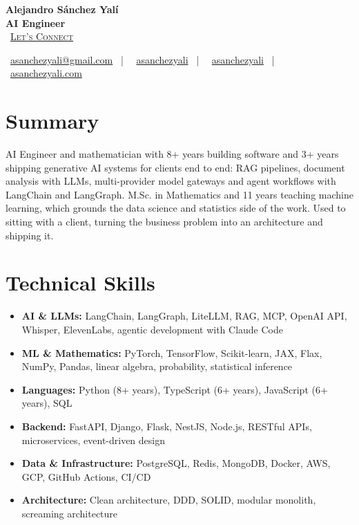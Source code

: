 \documentclass[letterpaper,10pt]{article}
\newcommand{\normalfaCalendar}{{\mdseries\faCalendar}}
\newcommand{\normalfaEnvelope}{{\mdseries\faEnvelope}}
\newcommand{\normalfaLinkedin}{{\mdseries\faLinkedin}}
\newcommand{\normalfaGithub}{{\mdseries\faGithub}}
\newcommand{\normalfaGlobe}{{\mdseries\faGlobe}}
\begin{document}
\begin{center}
\textbf{\LARGE Alejandro S\'anchez Yal\'i}\\[0.2em]
\textbf{\Large AI Engineer}\\[0.4em]
\small
\normalfaCalendar\ \href{https://cal.com/asanchezyali/full-time-opportunities}{\textsc{Let's Connect}}

\vspace{0.5em}
\normalfaEnvelope\ \href{mailto:asanchezyali@gmail.com}{asanchezyali@gmail.com}  ~|~
\normalfaLinkedin\ \href{https://www.linkedin.com/in/asanchezyali}{asanchezyali} ~|~
\normalfaGithub\ \href{https://github.com/asanchezyali}{asanchezyali}  ~|~
\normalfaGlobe\ \href{https://asanchezyali.com}{asanchezyali.com}
\end{center}


\section{Summary}
AI Engineer and mathematician with 8+ years building software and 3+ years shipping generative AI systems for clients end to end: RAG pipelines, document analysis with LLMs, multi-provider model gateways and agent workflows with LangChain and LangGraph. M.Sc. in Mathematics and 11 years teaching machine learning, which grounds the data science and statistics side of the work. Used to sitting with a client, turning the business problem into an architecture and shipping it.

\section{Technical Skills}
\begin{itemize}[leftmargin=*, itemsep=0pt]
  \item \textbf{AI \& LLMs:} LangChain, LangGraph, LiteLLM, RAG, MCP, OpenAI API, Whisper, ElevenLabs, agentic development with Claude Code
  \item \textbf{ML \& Mathematics:} PyTorch, TensorFlow, Scikit-learn, JAX, Flax, NumPy, Pandas, linear algebra, probability, statistical inference
  \item \textbf{Languages:} Python (8+ years), TypeScript (6+ years), JavaScript (6+ years), SQL
  \item \textbf{Backend:} FastAPI, Django, Flask, NestJS, Node.js, RESTful APIs, microservices, event-driven design
  \item \textbf{Data \& Infrastructure:} PostgreSQL, Redis, MongoDB, Docker, AWS, GCP, GitHub Actions, CI/CD
  \item \textbf{Architecture:} Clean architecture, DDD, SOLID, modular monolith, screaming architecture
\end{itemize}
\end{document}

